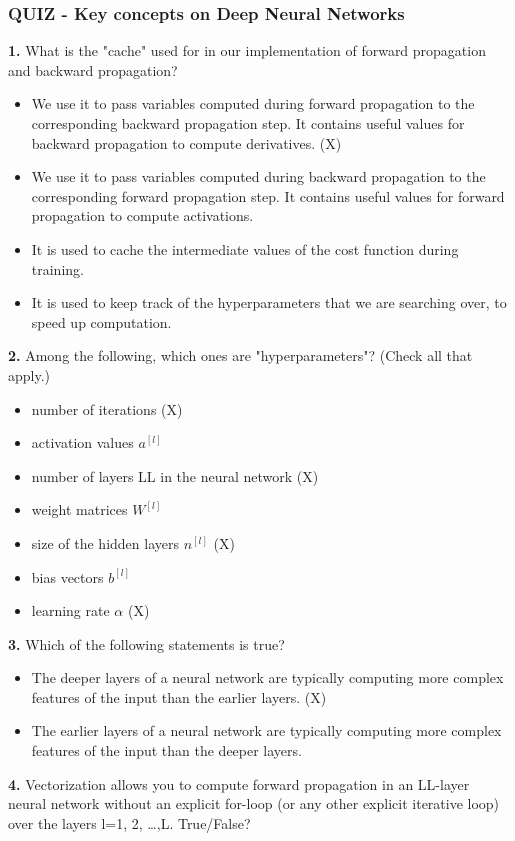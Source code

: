 \subsubsection*{QUIZ - Key concepts on Deep Neural Networks}
\textbf{1.} What is the "cache" used for in our implementation of forward propagation and backward propagation?
\begin{itemize}
    \item We use it to pass variables computed during forward propagation to the corresponding backward propagation step. It contains useful values for backward propagation to compute derivatives. (X)
    \item We use it to pass variables computed during backward propagation to the corresponding forward propagation step. It contains useful values for forward propagation to compute activations.
    \item It is used to cache the intermediate values of the cost function during training.
    \item It is used to keep track of the hyperparameters that we are searching over, to speed up computation.
\end{itemize}
\textbf{2.} Among the following, which ones are "hyperparameters"? (Check all that apply.)
\begin{itemize}
    \item number of iterations (X)
    \item activation values $a^{[l]}$
    \item number of layers LL in the neural network (X)
    \item weight matrices $W^{[l]}$
    \item size of the hidden layers $n^{[l]}$ (X)
    \item bias vectors $b^{[l]}$
    \item learning rate $\alpha$ (X)
\end{itemize}
\textbf{3.} Which of the following statements is true?
\begin{itemize}
    \item The deeper layers of a neural network are typically computing more complex features of the input than the earlier layers. (X)
    \item The earlier layers of a neural network are typically computing more complex features of the input than the deeper layers.
\end{itemize}
\textbf{4.} Vectorization allows you to compute forward propagation in an LL-layer neural network without an explicit for-loop (or any other explicit iterative loop) over the layers l=1, 2, …,L. True/False?
